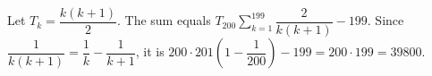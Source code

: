 Let $T_k=\dfrac{k(k+1)}{2}$. The sum equals $T_{200}\sum_{k=1}^{199}\dfrac{2}{k(k+1)}-199$. Since $\dfrac{1}{k(k+1)}=\dfrac{1}{k}-\dfrac{1}{k+1}$, it is $200\cdot201(1-\dfrac{1}{200})-199=200\cdot199=\boxed{39800}$.
